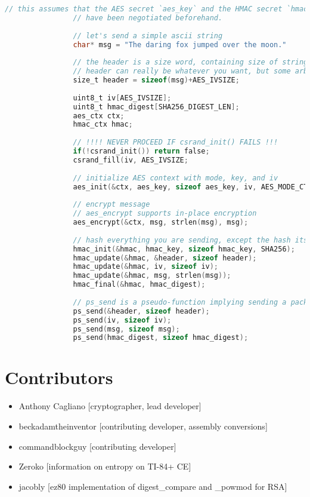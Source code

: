 \documentclass[titlepage]{article}
\begin{document}
			\begin{lstlisting}[language=C,title=Sample authenticated encryption construction using CryptX API]
				// this assumes that the AES secret `aes_key` and the HMAC secret `hmac_key`
				// have been negotiated beforehand.
				
				// let's send a simple ascii string
				char* msg = "The daring fox jumped over the moon."
				
				// the header is a size word, containing size of string plus our IV
				// header can really be whatever you want, but some arbitrary nonsense as an example
				size_t header = sizeof(msg)+AES_IVSIZE;
				
				uint8_t iv[AES_IVSIZE];
				uint8_t hmac_digest[SHA256_DIGEST_LEN];
				aes_ctx ctx;
				hmac_ctx hmac;
				
				// !!!! NEVER PROCEED IF csrand_init() FAILS !!!
				if(!csrand_init()) return false;
				csrand_fill(iv, AES_IVSIZE;
				
				// initialize AES context with mode, key, and iv
				aes_init(&ctx, aes_key, sizeof aes_key, iv, AES_MODE_CTR);
				
				// encrypt message
				// aes_encrypt supports in-place encryption
				aes_encrypt(&ctx, msg, strlen(msg), msg);
				
				// hash everything you are sending, except the hash itself
				hmac_init(&hmac, hmac_key, sizeof hmac_key, SHA256);
				hmac_update(&hmac, &header, sizeof header);
				hmac_update(&hmac, iv, sizeof iv);
				hmac_update(&hmac, msg, strlen(msg));
				hmac_final(&hmac, hmac_digest);
				
				// ps_send is a pseudo-function implying sending a packet segment over network
				ps_send(&header, sizeof header);
				ps_send(iv, sizeof iv);
				ps_send(msg, sizeof msg);
				ps_send(hmac_digest, sizeof hmac_digest);	
\end{lstlisting}
\newpage			
			\section{Contributors}
				\begin{itemize}
					\item Anthony Cagliano [cryptographer, lead developer]
					\item beckadamtheinventor [contributing developer, assembly conversions]
					\item commandblockguy [contributing developer]
					\item Zeroko [information on entropy on TI-84+ CE]
					\item jacobly [ez80 implementation of digest\_compare and \_powmod for RSA]
				\end{itemize}
\end{document}
